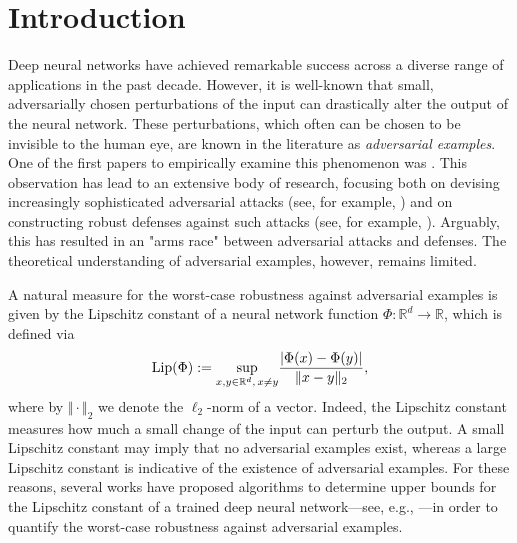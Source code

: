 
\section{Introduction}

Deep neural networks have achieved remarkable success across a diverse range of applications in the past decade. 
However, it is well-known that small, adversarially chosen perturbations of the input can drastically alter the output of the neural network.
These perturbations, which often can be chosen to be invisible to the human eye,
are known in the literature as \textit{adversarial examples}.
One of the first papers to empirically examine this phenomenon was \cite{szegedy2013intriguing}.
This observation has lead to an extensive body of research,
focusing both on devising increasingly sophisticated adversarial attacks
(see, for example,  \cite{papernot2016limitations,moosavi2016deepfool,kurakin2018adversarial,athalye2018obfuscated,carlini2018audio})
and on constructing robust defenses against such attacks
(see, for example, \cite{madry2018towards,schott2018towards,pang2019improving,dong2020adversarial,bui2021unified}).
Arguably, this has resulted in an "arms race" between adversarial attacks and defenses. 
The theoretical understanding of adversarial examples, however, remains limited.

A natural measure for the worst-case robustness against adversarial examples is given
by the Lipschitz constant of a neural network function $\Phi: \mathbb{R}^d \rightarrow \mathbb{R}$,
which is defined via
\begin{equation*}
  \operatorname{Lip} (\Phi )
  :=
  \underset{x,y \in \mathbb{R}^d, \, x \neq y}{\sup}  \frac{\vert \Phi (x)- \Phi (y) \vert}{\Vert x - y \Vert_2},
\end{equation*}
where by $\Vert \cdot \Vert_2$ we denote the $\ell_2$-norm of a vector.
Indeed, the Lipschitz constant measures how much a small change of the input can perturb the output. 
A small Lipschitz constant may imply that no adversarial examples exist,
whereas a large Lipschitz constant is indicative of the existence of adversarial examples.
For these reasons, several works have proposed algorithms to determine
upper bounds for the Lipschitz constant of a trained deep neural network---see,
e.g., \cite{fazlyab2019efficient,ebihara2023local,shi2022efficiently}---in order to quantify the worst-case robustness against adversarial examples.



